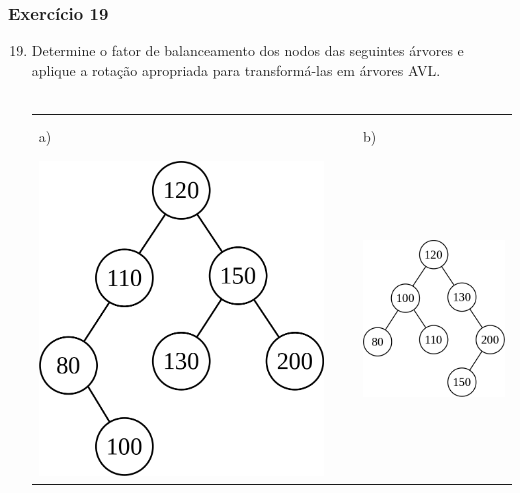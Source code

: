 \documentclass[aspectratio=169]{beamer}
\begin{document}
\begin{frame}[fragile]\frametitle{Exercício 19}
\begin{enumerate}
	\setcounter{enumi}{18}
	\item Determine o fator de balanceamento dos nodos das seguintes árvores e aplique a rotação apropriada para transformá-las em árvores AVL.\\~\\
\begin{tabular}{lll}
a) & ~ ~ & b)\\
\includegraphics[height=0.4\paperheight]{imagens/avl17.png} & ~ ~ &
\includegraphics[height=0.4\paperheight]{imagens/avl18.png} \\

\end{tabular}
\end{enumerate}
\end{frame}
\end{document}
